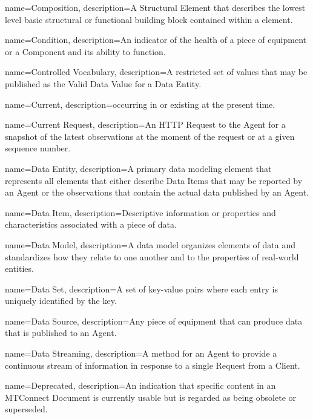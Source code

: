 {
    name={Composition},
	description={A \gls{Structural Element} that describes the lowest level basic structural or functional building block contained within a  element.}
}

{
    name={Condition},
	description={An indicator of the health of a piece of equipment or a \gls{Component} and its ability to function.}
}

{
    name={Controlled Vocabulary},
	description={A restricted set of values that may be published as the \gls{Valid Data Value} for a \gls{Data Entity}.}
}

{
    name={Current},
	description={occurring in or existing at the present time.}
}

{
    name={Current Request},
	description={An \gls{HTTP Request} to the \gls{Agent} for a snapshot of the latest \glspl{observation} at the moment of the request or at a given sequence number.}
}

{
    name={Data Entity},
	description={A primary data modeling element that represents all elements that either describe \glspl{Data Item} that may be reported by an \gls{Agent} or the \glspl{observation} that contain the actual data published by an \gls{Agent}.
}
}

{
    name={Data Item},
	description={Descriptive information or properties and characteristics associated with a piece of data.
}
}

{
    name={Data Model},
	description={A data model organizes elements of data and standardizes how they relate to one another and to the properties of real-world entities.}
}

{
    name={Data Set},
	description={A set of \glspl{key-value pair} where each entry is uniquely identified by the \gls{key}.}
}

{
    name={Data Source},
	description={Any piece of equipment that can produce data that is published to an \gls{Agent}.
}
}

{
    name={Data Streaming},
	description={A method for an \gls{Agent} to provide a continuous stream of information in response to a single \gls{Request} from a \gls{Client}.}
}

{
    name={Deprecated},
	description={An indication that specific content in an \gls{MTConnect Document} is currently usable but is regarded as being obsolete or superseded. }
}

